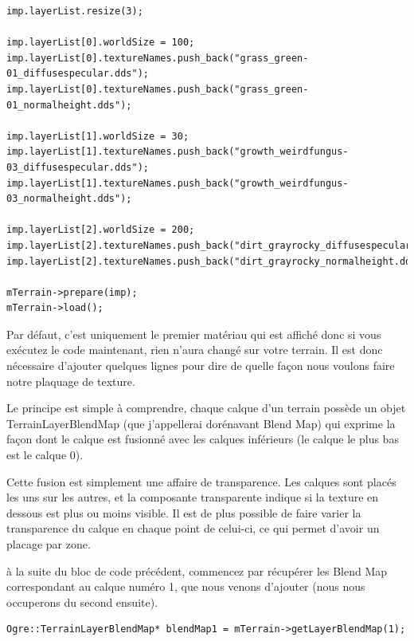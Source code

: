 \begin{lstlisting}[caption={Ajout de calques}]
imp.layerList.resize(3);

imp.layerList[0].worldSize = 100;
imp.layerList[0].textureNames.push_back("grass_green-01_diffusespecular.dds");
imp.layerList[0].textureNames.push_back("grass_green-01_normalheight.dds");

imp.layerList[1].worldSize = 30;
imp.layerList[1].textureNames.push_back("growth_weirdfungus-03_diffusespecular.dds");
imp.layerList[1].textureNames.push_back("growth_weirdfungus-03_normalheight.dds");

imp.layerList[2].worldSize = 200;
imp.layerList[2].textureNames.push_back("dirt_grayrocky_diffusespecular.dds");
imp.layerList[2].textureNames.push_back("dirt_grayrocky_normalheight.dds");

mTerrain->prepare(imp);
mTerrain->load();
\end{lstlisting}

Par défaut, c'est uniquement le premier matériau qui est affiché donc si vous exécutez le code maintenant, rien n'aura changé sur votre terrain.  Il est donc nécessaire d'ajouter quelques lignes pour dire de quelle façon nous voulons faire notre plaquage de texture.\newline

Le principe est simple à comprendre, chaque calque d'un terrain possède un objet TerrainLayerBlendMap (que j'appellerai dorénavant Blend Map) qui exprime la façon dont le calque est fusionné avec les calques inférieurs (le calque le plus bas est le calque 0).

Cette fusion est simplement une affaire de transparence. Les calques sont placés les uns sur les autres, et la composante transparente indique si la texture en dessous est plus ou moins visible. Il est de plus possible de faire varier la transparence du calque en chaque point de celui-ci, ce qui permet d'avoir un placage par zone.\newline

à la suite du bloc de code précédent, commencez par récupérer les Blend Map correspondant au calque numéro 1, que nous venons d'ajouter (nous nous occuperons du second ensuite).

\begin{lstlisting}[caption={Récupération du Blend Map pour le premier terrain}]
Ogre::TerrainLayerBlendMap* blendMap1 = mTerrain->getLayerBlendMap(1);
\end{lstlisting}

